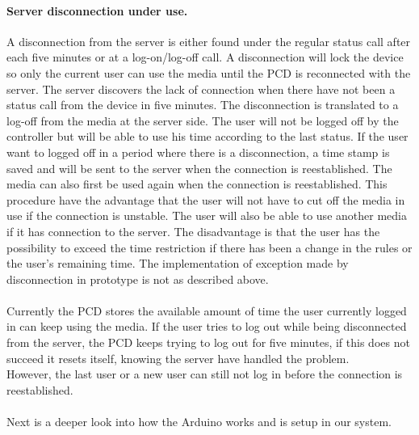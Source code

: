 \paragraph{Server disconnection under use.} \newline
A disconnection from the server is either found under the regular status call after each five minutes or at a log-on/log-off call. A disconnection will lock the device so only the current user can use the media until the PCD is reconnected with the server. The server discovers the lack of connection when there have not been a status call from the device in five minutes. The disconnection is translated to a log-off from the media at the server side. 
The user will not be logged off by the controller but will be able to use his time according to the last status. If the user want to logged off in a period where there is a disconnection, a time stamp is saved and will be sent to the server when the connection is reestablished. The media can also first be used again when the connection is reestablished. 
This procedure have the advantage that the user will not have to cut off the media in use if the connection is unstable. The user will also be able to use another media if it has connection to the server.
The disadvantage is that the user has the possibility to exceed the time restriction if there has been a change in the rules or the user's remaining time. \newline
The implementation of exception made by disconnection in prototype is not as described above.\\
\\
Currently the PCD stores the available amount of time the user currently logged in can keep using the media. 
If the user tries to log out while being disconnected from the server, the PCD keeps trying to log out for five minutes, if this does not succeed it resets itself, knowing the server have handled the problem.\\
However, the last user or a new user can still not log in before the connection is reestablished.\\
\\

Next is a deeper look into how the Arduino works and is setup in our system.